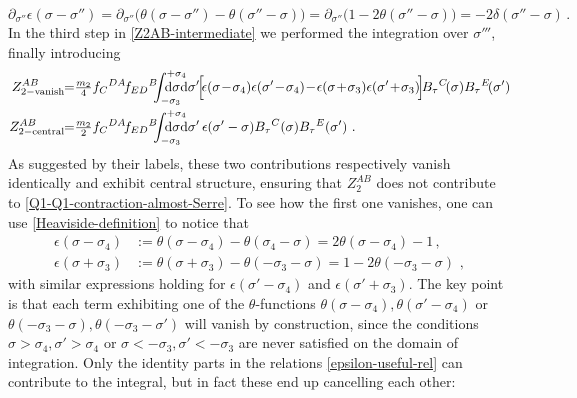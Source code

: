 \documentclass[12pt]{article}
\numberwithin{equation}{section}
\begin{document}
\begin{equation}
\partial_{\sigma''}\epsilon(\sigma-\sigma'')=\partial_{\sigma''}\bigl(\theta(\sigma-\sigma'')-\theta(\sigma''-\sigma)\bigr)=\partial_{\sigma''}\bigl(1-2\theta(\sigma''-\sigma)\bigr)=-2\delta(\sigma''-\sigma) \, .
\end{equation}
In the third step in \eqref{Z2AB-intermediate} we performed the integration over $\sigma'''$, finally introducing
\begin{align}\label{Z2vanish-Z2central-definition}
Z_{2-\text{vanish}}^{AB}\!\!=&\tfrac{m_{2}}{4}f_{C}{}^{DA}\!f_{ED}{}^{B}\!\!\!\int_{-\sigma_{3}}^{+\sigma_{4}}\!\!\!\!\!\!\!\!\!\!\!\mathrm{d}\sigma\mathrm{d}\sigma' \! \Bigl[ \! \epsilon(\sigma\!-\!\sigma_{4})\epsilon(\sigma'\!-\!\sigma_{4})\!-\!\epsilon(\sigma\!+\!\sigma_{3})\epsilon(\sigma'\!+\!\sigma_{3})\!\Bigr]\!B_{\tau}{}^{C}\!(\sigma)B_{\tau}{}^{E}\!(\sigma')
\notag\\
Z_{2-\text{central}}^{AB}\!\!=&\tfrac{m_{2}}{2}f_{C}{}^{DA}\!f_{ED}{}^{B}\!\!\!\int_{-\sigma_{3}}^{+\sigma_{4}}\!\!\!\!\!\!\!\!\!\!\!\mathrm{d}\sigma\mathrm{d}\sigma' \, \epsilon(\sigma'-\sigma)B_{\tau}{}^{C}(\sigma)B_{\tau}{}^{E}(\sigma') \,\, .
\end{align}
As suggested by their labels, these two contributions respectively vanish identically and exhibit central structure, ensuring that $Z_{2}^{AB}$ does not contribute to \eqref{Q1-Q1-contraction-almost-Serre}. To see how the first one vanishes, one can use \eqref{Heaviside-definition} to notice that
\begin{equation}\label{epsilon-useful-rel}
\begin{aligned}
\epsilon(\sigma-\sigma_{4})&:=\theta(\sigma-\sigma_{4})-\theta(\sigma_{4}-\sigma)=2\theta(\sigma-\sigma_{4})-1 \, ,
\\
\epsilon(\sigma+\sigma_{3})&:=\theta(\sigma+\sigma_{3})-\theta(-\sigma_{3}-\sigma)=1-2\theta(-\sigma_{3}-\sigma) \,\, ,
\end{aligned}
\end{equation}
with similar expressions holding for $\epsilon(\sigma'-\sigma_{4})$ and $\epsilon(\sigma'+\sigma_{3})$. The key point is that each term exhibiting one of the $\theta$-functions $\theta(\sigma-\sigma_{4}),\theta(\sigma'-\sigma_{4})$ or $\theta(-\sigma_{3}-\sigma),\theta(-\sigma_{3}-\sigma')$ will vanish by construction, since the conditions $\sigma>\sigma_{4},\sigma'>\sigma_{4}$ or $\sigma<-\sigma_{3},\sigma'<-\sigma_{3}$ are never satisfied on the domain of integration. Only the identity parts in the relations \eqref{epsilon-useful-rel} can contribute to the integral, but in fact these end up cancelling each other:
\end{document}
